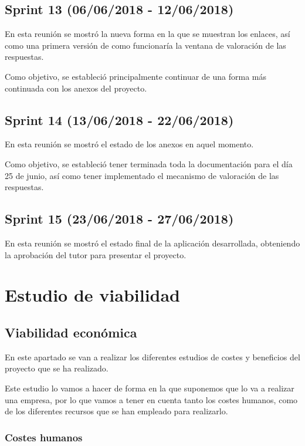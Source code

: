 \subsection{Sprint 13 (06/06/2018 - 12/06/2018)}

En esta reunión se mostró la nueva forma en la que se muestran los enlaces, así como una primera versión de como funcionaría la ventana de valoración de las respuestas.

Como objetivo, se estableció principalmente continuar de una forma más continuada con los anexos del proyecto.

\subsection{Sprint 14 (13/06/2018 - 22/06/2018)}

En esta reunión se mostró el estado de los anexos en aquel momento.

Como objetivo, se estableció tener terminada toda la documentación para el día 25 de junio, así como tener implementado el mecanismo de valoración de las respuestas.

\subsection{Sprint 15 (23/06/2018 - 27/06/2018)}

En esta reunión se mostró el estado final de la aplicación desarrollada, obteniendo la aprobación del tutor para presentar el proyecto.


\section{Estudio de viabilidad}

\subsection{Viabilidad económica}

En este apartado se van a realizar los diferentes estudios de costes y beneficios del proyecto que se ha realizado.

Este estudio lo vamos a hacer de forma en la que suponemos que lo va a realizar una empresa, por lo que vamos a tener en cuenta tanto los costes humanos, como de los diferentes recursos que se han empleado para realizarlo.

\subsubsection{Costes humanos}

